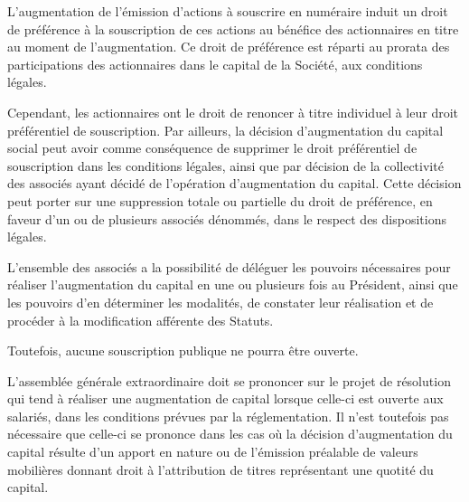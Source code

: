 \documentclass[a4paper,12pt]{report}
\begin{document}
L'augmentation de l'émission d'actions à souscrire en numéraire induit un droit de préférence à la souscription de ces actions 
au bénéfice des actionnaires en titre au moment de l'augmentation. Ce droit de préférence est réparti au prorata des participations 
des actionnaires dans le capital de la Société, aux conditions légales.

Cependant, les actionnaires ont le droit de renoncer à titre individuel à leur droit préférentiel de souscription. 
Par ailleurs, la décision d'augmentation du capital social peut avoir comme conséquence de supprimer le droit préférentiel de souscription 
dans les conditions légales, ainsi que par décision de la collectivité des associés ayant décidé de l'opération d'augmentation du capital. 
Cette décision peut porter sur une suppression totale ou partielle du droit de préférence, en faveur d'un ou de plusieurs associés dénommés, 
dans le respect des dispositions légales.

L'ensemble des associés a la possibilité de déléguer les pouvoirs nécessaires pour réaliser l'augmentation du capital en une ou plusieurs fois au Président, 
ainsi que les pouvoirs d'en déterminer les modalités, de constater leur réalisation et de procéder à la modification afférente des Statuts.

Toutefois, aucune souscription publique ne pourra être ouverte.

L'assemblée générale extraordinaire doit se prononcer sur le projet de résolution qui tend à réaliser une augmentation de capital 
lorsque celle-ci est ouverte aux salariés, dans les conditions prévues par la réglementation. 
Il n'est toutefois pas nécessaire que celle-ci se prononce dans les cas où la décision d'augmentation du capital résulte d'un apport en nature 
ou de l'émission préalable de valeurs mobilières donnant droit à l'attribution de titres représentant une quotité du capital.

\end{document}
